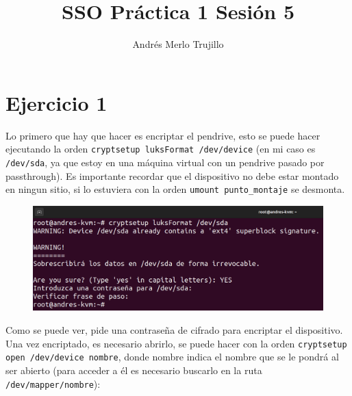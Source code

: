 \documentclass{article}
\title{SSO Práctica 1 Sesión 5}
\author{Andrés Merlo Trujillo}
\date{}
\begin{document}
\maketitle

\tableofcontents

\newpage


\section*{Ejercicio 1}

Lo primero que hay que hacer es encriptar el pendrive, esto se puede hacer ejecutando la orden \verb|cryptsetup luksFormat /dev/device| (en mi caso es \verb|/dev/sda|, ya que estoy en una máquina virtual con un pendrive pasado por passthrough). Es importante recordar que el dispositivo no debe estar montado en ningun sitio, si lo estuviera con la orden \verb|umount punto_montaje| se desmonta.

\begin{figure}[H]
    \includegraphics[width=\textwidth]{imagenes/Captura desde 2022-10-30 10-51-54.png}
\end{figure}

Como se puede ver, pide una contraseña de cifrado para encriptar el dispositivo. Una vez encriptado, es necesario abrirlo, se puede hacer con la orden \verb|cryptsetup open /dev/device nombre|, donde nombre indica el nombre que se le pondrá al ser abierto (para acceder a él es necesario buscarlo en la ruta \verb|/dev/mapper/nombre|):
\end{document}
